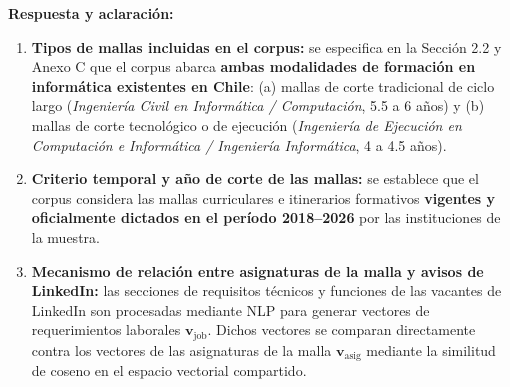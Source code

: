 \vspace{0.4cm}

\noindent
{}

\vspace{0.2cm}

\noindent
\textbf{Respuesta y aclaración:}
\begin{enumerate}[leftmargin=*]
	\item \textbf{Tipos de mallas incluidas en el corpus:} se especifica  en la Sección 2.2 y Anexo C que el corpus abarca \textbf{ambas modalidades de formación en informática existentes en Chile}: (a) mallas de corte tradicional de ciclo largo (\textit{Ingeniería Civil en Informática / Computación}, 5.5 a 6 años) y (b) mallas de corte tecnológico o de ejecución (\textit{Ingeniería de Ejecución en Computación e Informática / Ingeniería Informática}, 4 a 4.5 años).
	\item \textbf{Criterio temporal y año de corte de las mallas:} se establece que el corpus considera las mallas curriculares e itinerarios formativos \textbf{vigentes y oficialmente dictados en el período 2018–2026} por las instituciones de la muestra.
	\item \textbf{Mecanismo de relación entre asignaturas de la malla y avisos de LinkedIn:} las secciones de requisitos técnicos y funciones de las vacantes de LinkedIn son procesadas mediante NLP para generar vectores de requerimientos laborales $\mathbf{v}_{\text{job}}$. Dichos vectores se comparan directamente contra los vectores de las asignaturas de la malla $\mathbf{v}_{\text{asig}}$ mediante la similitud de coseno en el espacio vectorial compartido.
\end{enumerate}

\newpage

\noindent
{}

